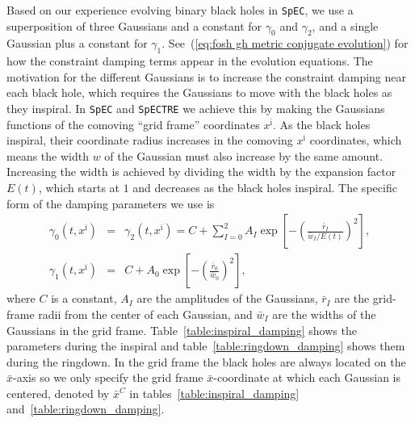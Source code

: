 \documentclass[12pt]{caltech_thesis}
\begin{document}
\begin{bibunit}[unsrtnat]
Based on our experience evolving binary black holes in \texttt{SpEC}, we use a
superposition of three Gaussians and a constant for $\gamma_0$ and $\gamma_2$,
and a single Gaussian plus a constant for $\gamma_1$. See~(\ref{eq:fosh gh
  metric conjugate evolution}) for how the constraint damping terms appear in the
evolution equations. The motivation for the different Gaussians is to increase
the constraint damping near each black hole, which requires the Gaussians to
move with the black holes as they inspiral. In \texttt{SpEC} and
\texttt{SpECTRE} we achieve this by making the Gaussians functions of the
comoving ``grid frame'' coordinates $x^{\bar{\imath}}$. As the black holes
inspiral, their coordinate radius increases in the comoving $x^{\bar{\imath}}$
coordinates, which means the width $w$ of the Gaussian must also increase by the
same amount. Increasing the width is achieved by dividing the width by the
expansion factor $E(t)$, which starts at $1$ and decreases as the black holes
inspiral. The specific form of the damping parameters we use is
\begin{eqnarray}
  \label{eq:gamma_0_2_gaussian}
  \gamma_0(t, x^{\bar{\imath}})
  &=& \gamma_2(t, x^{\bar{\imath}}) = C
      + \sum_{I=0}^2 A_I
      \exp\left[-\left(\frac{\bar{r}_I}{\bar{w}_I
      / E(t)}\right)^2\right],\\
  \label{eq:gamma_1_gaussian}
  \gamma_1(t, x^{\bar{\imath}})
  &=& C + A_{0} \exp\left[-\left(\frac{\bar{r}_0}{\bar{w}_{0}}\right)^2\right],
\end{eqnarray}
where $C$ is a constant, $A_I$ are the amplitudes of the Gaussians, $\bar{r}_I$
are the grid-frame radii from the center of each Gaussian, and $\bar{w}_I$ are
the widths of the Gaussians in the grid
frame. Table~\ref{table:inspiral_damping} shows the parameters during the
inspiral and table~\ref{table:ringdown_damping} shows them during the
ringdown. In the grid frame the black holes are always located on the
$\bar{x}$-axis so we only specify the grid frame $\bar{x}$-coordinate at which
each Gaussian is centered, denoted by $\bar{x}^C$ in
tables~\ref{table:inspiral_damping} and~\ref{table:ringdown_damping}.


\end{bibunit}
\end{document}
